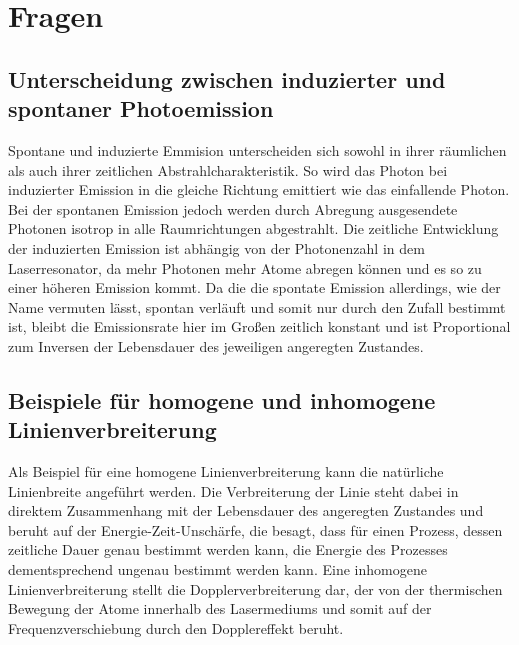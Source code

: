\section{Fragen}
\subsection{Unterscheidung zwischen induzierter und spontaner  Photoemission}
Spontane und induzierte Emmision unterscheiden sich sowohl in ihrer räumlichen als auch ihrer zeitlichen Abstrahlcharakteristik. \newline
So wird das Photon bei induzierter Emission in die gleiche Richtung emittiert wie das einfallende Photon. Bei der spontanen Emission jedoch werden durch Abregung ausgesendete Photonen isotrop in alle Raumrichtungen abgestrahlt. \newline
Die zeitliche Entwicklung der induzierten Emission ist abhängig von der Photonenzahl in dem Laserresonator, da mehr Photonen mehr Atome abregen können und es so zu einer höheren Emission kommt. Da die die spontate Emission allerdings, wie der Name vermuten lässt, spontan verläuft und somit nur durch den Zufall bestimmt ist, bleibt die Emissionsrate hier im Großen zeitlich konstant und ist Proportional zum Inversen der Lebensdauer des jeweiligen angeregten Zustandes.
\subsection{Beispiele für homogene und inhomogene Linienverbreiterung} 
Als Beispiel für eine homogene Linienverbreiterung kann die natürliche Linienbreite angeführt werden. Die Verbreiterung der Linie steht dabei in direktem Zusammenhang mit der Lebensdauer des angeregten Zustandes und beruht auf der Energie-Zeit-Unschärfe, die besagt, dass für einen Prozess, dessen zeitliche Dauer genau bestimmt werden kann, die Energie des Prozesses dementsprechend ungenau bestimmt werden kann. \newline
Eine inhomogene Linienverbreiterung stellt die Dopplerverbreiterung dar, der von der thermischen Bewegung der Atome innerhalb des Lasermediums und somit auf der Frequenzverschiebung durch den Dopplereffekt beruht. 
